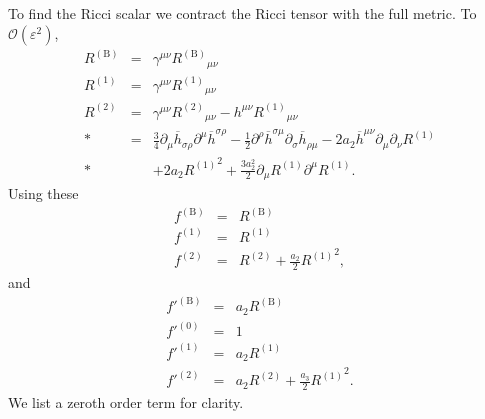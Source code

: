 \documentclass[aps,prd,amsfonts,amssymb,amsmath,nofootinbib,reprint,showpacs]{revtex4-1}
\newcommand{\recip}[1]{\ensuremath{\frac{1}{#1}}}
\newcommand{\order}[1]{\ensuremath{\mathcal{O}({#1})}}
\begin{document}
To find the Ricci scalar we contract the Ricci tensor with the full metric. To $\order{\varepsilon^2}$,
\begin{eqnarray}
R^{(\text{B})} & = & \gamma^{\mu\nu} {R^{(\text{B})}}_{\mu\nu} \\
R^{(1)} & = & \gamma^{\mu\nu} {R^{(1)}}_{\mu\nu} \\
R^{(2)} & = & \gamma^{\mu\nu} {R^{(2)}}_{\mu\nu} - h^{\mu\nu} {R^{(1)}}_{\mu\nu} \nonumber \\*
 & = & \frac{3}{4}\partial_\mu\overline{h}_{\sigma\rho}\partial^\mu\overline{h}^{\sigma\rho} - \recip{2} \partial^\rho\overline{h}^{\sigma\mu}\partial_\sigma\overline{h}_{\rho\mu} - 2a_2 \overline{h}^{\mu\nu}\partial_\mu\partial_\nu R^{(1)} \nonumber \\*
 & & + 2 a_2 {R^{(1)}}^2 + \frac{3a_2^2}{2}\partial_\mu R^{(1)} \partial^\mu R^{(1)}.
\end{eqnarray}
Using these
\begin{eqnarray}
f^{(\text{B})} & = & R^{(\text{B})} \\
f^{(1)} & = & R^{(1)} \\
f^{(2)} & = & R^{(2)} + \frac{a_2}{2}{R^{(1)}}^2,
\end{eqnarray}
and
\begin{eqnarray}
f'^{(\text{B})} & = & a_2 R^{(\text{B})} \\
f'^{(0)} & = & 1 \\
f'^{(1)} & = & a_2 R^{(1)} \\
f'^{(2)} & = & a_2 R^{(2)} + \frac{a_3}{2}{R^{(1)}}^2.
\end{eqnarray}
We list a zeroth order term for clarity.
\end{document}
